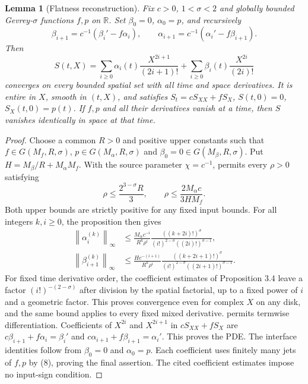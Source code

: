 \documentclass[11pt]{article}
\newtheorem{lemma}[theorem]{Lemma}
\newcommand{\norm}[1]{\left\lVert#1\right\rVert}
\begin{document}
\begin{lemma}[Flatness reconstruction]\label{lem:flatness}
Fix $c>0$, $1<\sigma<2$ and globally bounded Gevrey-$\sigma$
functions $f,p$ on $\mathbb R$. Set $\beta_0=0$, $\alpha_0=p$,
and recursively
\[
 \beta_{i+1}=c^{-1}(\beta_i'-f\alpha_i),\qquad
 \alpha_{i+1}=c^{-1}(\alpha_i'-f\beta_{i+1}). \tag{8}
\]
Then
\[
 S(t,X)=\sum_{i\ge0}\alpha_i(t)\frac{X^{2i+1}}{(2i+1)!}
       +\sum_{i\ge0}\beta_i(t)\frac{X^{2i}}{(2i)!} \tag{9}
\]
converges on every bounded spatial set with all time and space
derivatives. It is entire in $X$, smooth in $(t,X)$, and satisfies
$S_t=cS_{XX}+fS_X$, $S(t,0)=0$, $S_X(t,0)=p(t)$.
If $f,p$ and all their derivatives vanish at a time, then $S$ vanishes
identically in space at that time.
\end{lemma}
\begin{proof}
Choose a common $R>0$ and positive upper constants such that
$f\in G(M_f,R,\sigma)$, $p\in G(M_\alpha,R,\sigma)$ and
$\beta_0=0\in G(M_\beta,R,\sigma)$. Put
$H=M_\beta/R+M_\alpha M_f$.
With the source parameter $\chi=c^{-1}$,
\cite[Proposition 3.4]{CLT} permits every $\rho>0$ satisfying
\[
 \rho\le \frac{2^{3-\sigma}R}{3},\qquad
 \rho\le \frac{2M_\alpha c}{3H M_f}.
\]
Both upper bounds are strictly positive for any fixed input bounds.
For all integers $k,i\ge0$, the proposition then gives
\[
\begin{aligned}
 \norm{\alpha_i^{(k)}}_\infty
 &\le \frac{M_\alpha c^{-i}}{R^k\rho^i}
 \frac{((k+2i)!)^\sigma}
 {(i!)^{2-\sigma}((2i)!)^{\sigma-1}},\\
 \norm{\beta_{i+1}^{(k)}}_\infty
 &\le \frac{Hc^{-(i+1)}}{R^k\rho^i}
 \frac{((k+2i+1)!)^\sigma}
 {(i!)^{2-\sigma}((2i+1)!)^{\sigma-1}}.
\end{aligned}
\]
For fixed time derivative order, the coefficient estimates of
Proposition 3.4 leave a factor $(i!)^{-(2-\sigma)}$ after division
by the spatial factorial, up to a fixed power of $i$ and a geometric
factor. This proves convergence even for complex $X$ on any disk,
and the same bound applies to every fixed mixed derivative.
\cite[Corollary 3.6]{CLT} permits termwise differentiation. Coefficients of
$X^{2i}$ and $X^{2i+1}$ in $cS_{XX}+fS_X$ are
$c\beta_{i+1}+f\alpha_i=\beta_i'$ and
$c\alpha_{i+1}+f\beta_{i+1}=\alpha_i'$.
This proves the PDE. The interface identities follow from $\beta_0=0$
and $\alpha_0=p$. Each coefficient uses finitely many jets of $f,p$
by (8), proving the final assertion. The cited coefficient estimates impose no input-sign condition.
\end{proof}
\end{document}
